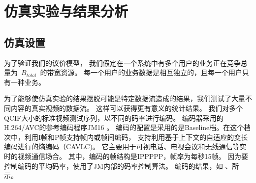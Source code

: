 \section{仿真实验与结果分析}
\subsection{仿真设置}
为了验证我们的议价模型，
我们假定在一个系统中有多个用户的业务正在竞争总量为~$B_{total}$~的带宽资源。
每一个用户的业务数据是相互独立的，且每一个用户只有一种业务。

为了能够使仿真实验的结果摆脱可能是特定数据流造成的结果，我们测试了大量不同内容的真实视频的数据流。
这样可以获得更有意义的统计结果。
 我们对多个QCIF大小的标准视频测试序列，以不同的码率进行编码。
编码器采用的H.264/AVC的参考编码程序JM16 \cite{h_264_codec}。
编码的配置是采用的是Baseline档。在这个档次中，利用I帧和P帧支持帧内或帧间编码，
支持利用基于上下文的自适应的变长编码进行的熵编码（CAVLC)。
它主要用于可视电话、电视会议和无线通信等实时的视频通信场合\cite{BiHouJie2009}。
其中，编码的帧结构是IPPPPP，帧率为每秒15帧。
因为要控制编码的平均码率，使用了JM内部的码率控制算法。
编码的结果，如 、所示。
